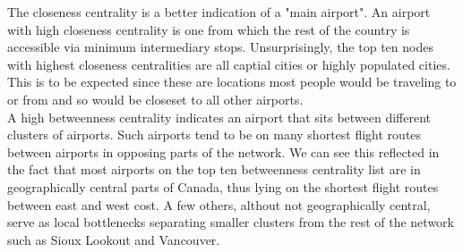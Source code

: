 \documentclass{article}
\begin{document}
\begin{enumerate}[label=(\alph*), left=10pt, itemsep=10pt]
\begin{minipage}[t]{0.9\textwidth}
            The closeness centrality is a better indication of a "main airport". An airport with
            high closeness centrality is one from which the rest of the country is accessible
            via minimum intermediary stops. Unsurprisingly, the top ten nodes with highest
            closeness centralities are all captial cities or highly populated cities.
            This is to be expected since these are locations most people would be traveling to or
            from and so would be closeset to all other airports.\\

            A high betweenness centrality indicates an airport that sits between different clusters
            of airports. Such airports tend to be on many shortest flight routes between airports
            in opposing parts of the network. We can see this reflected in the fact that most
            airports on the top ten betweenness centrality list are in geographically central parts
            of Canada, thus lying on the shortest flight routes between east and west cost.
            A few others, althout not geographically central, serve as local bottlenecks separating
            smaller clusters from the rest of the network such as Sioux Lookout and Vancouver.
        \end{minipage}


\end{enumerate}
\end{document}
